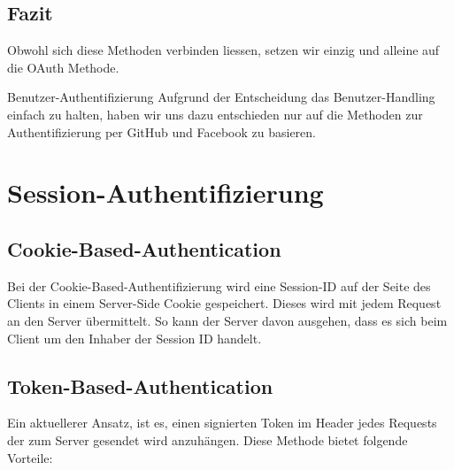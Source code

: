 \subsection{Fazit}
Obwohl sich diese Methoden verbinden liessen, setzen wir einzig und alleine auf die OAuth Methode.
\begin{decision}{Benutzer-Authentifizierung}
Aufgrund der Entscheidung das Benutzer-Handling einfach zu halten, haben wir uns dazu entschieden nur auf die Methoden zur Authentifizierung per GitHub und Facebook zu basieren.
\end{decision}

\section{Session-Authentifizierung}

\subsection{Cookie-Based-Authentication}
Bei der Cookie-Based-Authentifizierung wird eine Session-ID auf der Seite des Clients in einem Server-Side Cookie gespeichert. Dieses wird mit jedem Request an den Server übermittelt. So kann der Server davon ausgehen, dass es sich beim Client um den Inhaber der Session ID handelt.

\subsection{Token-Based-Authentication}
Ein aktuellerer Ansatz, ist es, einen signierten Token im Header jedes Requests der zum Server gesendet wird anzuhängen. Diese Methode bietet folgende Vorteile:

